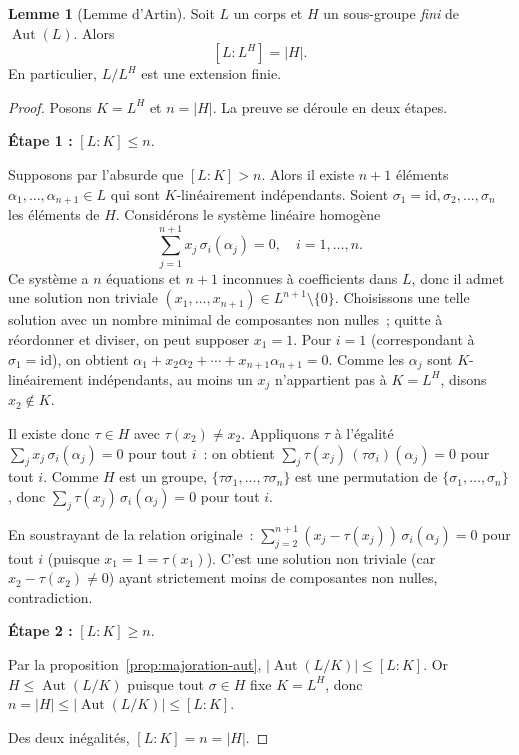 \documentclass[12pt,a4paper,openany]{book}
\theoremstyle{definition}
\newtheorem{lemme}{Lemme}[chapter]
\newcommand{\Aut}{\operatorname{Aut}}
\begin{document}
\begin{lemme}[Lemme d'Artin]\label{lem:artin}
Soit $L$ un corps et $H$ un sous-groupe \emph{fini} de $\Aut(L)$. Alors
\[
  [L : L^H] = |H|.
\]
En particulier, $L/L^H$ est une extension finie.
\end{lemme}

\begin{proof}
Posons $K = L^H$ et $n = |H|$. La preuve se déroule en deux étapes.

\medskip\noindent
\textbf{Étape 1 :} $[L:K] \leq n$.

Supposons par l'absurde que $[L:K] > n$. Alors il existe $n+1$ éléments
$\alpha_1, \ldots, \alpha_{n+1} \in L$ qui sont $K$-linéairement indépendants.
Soient $\sigma_1 = \mathrm{id}, \sigma_2, \ldots, \sigma_n$ les éléments
de $H$. Considérons le système linéaire homogène
\[
  \sum_{j=1}^{n+1} x_j \, \sigma_i(\alpha_j) = 0, \quad i = 1, \ldots, n.
\]
Ce système a $n$ équations et $n+1$ inconnues à coefficients dans $L$,
donc il admet une solution non triviale $(x_1, \ldots, x_{n+1}) \in L^{n+1}
\setminus \{0\}$. Choisissons une telle solution avec un nombre minimal de
composantes non nulles~; quitte à réordonner et diviser, on peut supposer
$x_1 = 1$. Pour $i = 1$ (correspondant à $\sigma_1 = \mathrm{id}$), on
obtient $\alpha_1 + x_2 \alpha_2 + \cdots + x_{n+1}\alpha_{n+1} = 0$.
Comme les $\alpha_j$ sont $K$-linéairement indépendants, au moins un $x_j$
n'appartient pas à $K = L^H$, disons $x_2 \notin K$.

Il existe donc $\tau \in H$ avec $\tau(x_2) \neq x_2$. Appliquons $\tau$
à l'égalité $\sum_j x_j \, \sigma_i(\alpha_j) = 0$ pour tout $i$~: on
obtient $\sum_j \tau(x_j)\, (\tau\sigma_i)(\alpha_j) = 0$ pour tout $i$.
Comme $H$ est un groupe, $\{\tau\sigma_1, \ldots, \tau\sigma_n\}$ est une
permutation de $\{\sigma_1, \ldots, \sigma_n\}$, donc
$\sum_j \tau(x_j)\,\sigma_i(\alpha_j) = 0$ pour tout $i$.

En soustrayant de la relation originale~:
$\sum_{j=2}^{n+1} (x_j - \tau(x_j))\,\sigma_i(\alpha_j) = 0$ pour tout $i$
(puisque $x_1 = 1 = \tau(x_1)$). C'est une solution non triviale (car
$x_2 - \tau(x_2) \neq 0$) ayant strictement moins de composantes non
nulles, contradiction.

\medskip\noindent
\textbf{Étape 2 :} $[L:K] \geq n$.

Par la proposition~\ref{prop:majoration-aut}, $|\Aut(L/K)| \leq [L:K]$.
Or $H \leq \Aut(L/K)$ puisque tout $\sigma \in H$ fixe $K = L^H$,
donc $n = |H| \leq |\Aut(L/K)| \leq [L:K]$.

\medskip
Des deux inégalités, $[L:K] = n = |H|$.
\end{proof}
\end{document}

